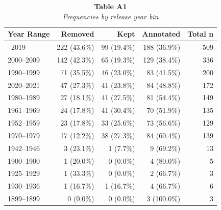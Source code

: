 \begin{table}
\caption*{
{\large \textbf{Table A1}} \\ 
{\small \emph{Frequencies by release year bin}}
} 
\fontsize{12.0pt}{14.4pt}\selectfont
\begin{tabular*}{\linewidth}{@{\extracolsep{\fill}}lrrrr}
\toprule
{Year Range} & Removed & Kept & Annotated & Total n \\ 
\midrule\addlinespace[2.5pt]
2010–2019 & 222 (43.6\%) & 99 (19.4\%) & 188 (36.9\%) & 509 \\ 
2000–2009 & 142 (42.3\%) & 65 (19.3\%) & 129 (38.4\%) & 336 \\ 
1990–1999 & 71 (35.5\%) & 46 (23.0\%) & 83 (41.5\%) & 200 \\ 
2020–2021 & 47 (27.3\%) & 41 (23.8\%) & 84 (48.8\%) & 172 \\ 
1980–1989 & 27 (18.1\%) & 41 (27.5\%) & 81 (54.4\%) & 149 \\ 
1961–1969 & 24 (17.8\%) & 41 (30.4\%) & 70 (51.9\%) & 135 \\ 
1952–1959 & 23 (17.8\%) & 33 (25.6\%) & 73 (56.6\%) & 129 \\ 
1970–1979 & 17 (12.2\%) & 38 (27.3\%) & 84 (60.4\%) & 139 \\ 
1942–1946 & 3 (23.1\%) & 1 (7.7\%) & 9 (69.2\%) & 13 \\ 
1900–1900 & 1 (20.0\%) & 0 (0.0\%) & 4 (80.0\%) & 5 \\ 
1925–1929 & 1 (33.3\%) & 0 (0.0\%) & 2 (66.7\%) & 3 \\ 
1930–1936 & 1 (16.7\%) & 1 (16.7\%) & 4 (66.7\%) & 6 \\ 
1899–1899 & 0 (0.0\%) & 0 (0.0\%) & 3 (100.0\%) & 3 \\ 
\bottomrule
\end{tabular*}
\end{table}

